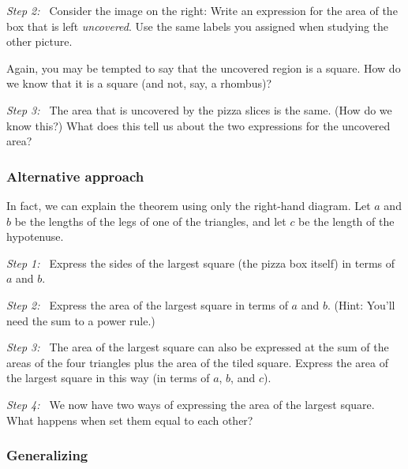 \textit{Step 2:~} Consider the image on the right: Write an expression for the area of the box that is left \textit{uncovered}. Use the same labels you assigned when studying the other picture.

Again, you may be tempted to say that the uncovered region is a square. How do we know that it is a square (and not, say, a rhombus)?

\textit{Step 3:~} The area that is uncovered by the pizza slices is the same. (How do we know this?) What does this tell us about the two expressions for the uncovered area?

\subsubsection{Alternative approach}

In fact, we can explain the theorem using only the right-hand diagram. Let $a$ and $b$ be the lengths of the legs of one of the triangles, and let $c$ be the length of the hypotenuse.

\begin{center}
\end{center}

\textit{Step 1:~} Express the sides of the largest square (the pizza box itself) in terms of $a$ and $b$.

\textit{Step 2:~} Express the area of the largest square in terms of $a$ and $b$. (Hint: You'll need the sum to a power rule.)

\textit{Step 3:~} The area of the largest square can also be expressed at the sum of the areas of the four triangles plus the area of the tiled square. Express the area of the largest square in this way (in terms of $a$, $b$, and $c$).

\textit{Step 4:~} We now have two ways of expressing the area of the largest square. What happens when set them equal to each other?

\subsubsection{Generalizing}

